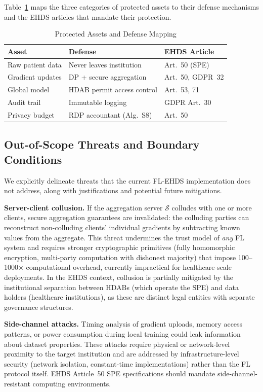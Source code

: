 \documentclass[conference]{IEEEtran}
\begin{document}
Table~\ref{tab:protected_assets} maps the three categories of protected assets to their defense mechanisms and the EHDS articles that mandate their protection.

\begin{table}[htbp]
\centering
\caption{Protected Assets and Defense Mapping}
\label{tab:protected_assets}
\small
\begin{tabular}{p{2cm}p{2.8cm}p{2cm}}
\toprule
\textbf{Asset} & \textbf{Defense} & \textbf{EHDS Article} \\
\midrule
Raw patient data & Never leaves institution & Art.~50 (SPE) \\
Gradient updates & DP + secure aggregation & Art.~50, GDPR~32 \\
Global model & HDAB permit access control & Art.~53, 71 \\
Audit trail & Immutable logging & GDPR Art.~30 \\
Privacy budget & RDP accountant (Alg.~S8) & Art.~50 \\
\bottomrule
\end{tabular}
\end{table}

\subsection{Out-of-Scope Threats and Boundary Conditions}

We explicitly delineate threats that the current FL-EHDS implementation does not address, along with justifications and potential future mitigations.

\textbf{Server-client collusion.} If the aggregation server $\mathcal{S}$ colludes with one or more clients, secure aggregation guarantees are invalidated: the colluding parties can reconstruct non-colluding clients' individual gradients by subtracting known values from the aggregate. This threat undermines the trust model of \textit{any} FL system and requires stronger cryptographic primitives (fully homomorphic encryption, multi-party computation with dishonest majority) that impose 100--1000$\times$ computational overhead, currently impractical for healthcare-scale deployments. In the EHDS context, collusion is partially mitigated by the institutional separation between HDABs (which operate the SPE) and data holders (healthcare institutions), as these are distinct legal entities with separate governance structures.

\textbf{Side-channel attacks.} Timing analysis of gradient uploads, memory access patterns, or power consumption during local training could leak information about dataset properties. These attacks require physical or network-level proximity to the target institution and are addressed by infrastructure-level security (network isolation, constant-time implementations) rather than the FL protocol itself. EHDS Article~50 SPE specifications should mandate side-channel-resistant computing environments.
\end{document}
